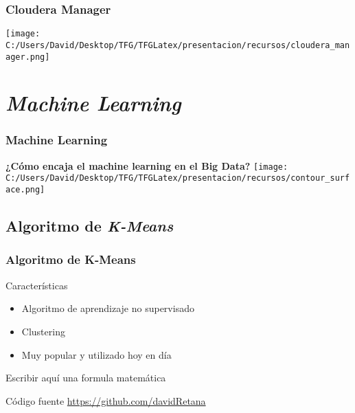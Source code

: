 \documentclass{beamer}
\begin{document}
\begin{frame}
  \frametitle{Cloudera Manager}
  \texttt{[image: C:/Users/David/Desktop/TFG/TFGLatex/presentacion/recursos/cloudera\_manager.png]}
\end{frame}

\section{\textit{Machine Learning}}

\begin{frame} %
\frametitle{Machine Learning}
\textbf{¿Cómo encaja el machine learning en el Big Data?}
\centering
\texttt{[image: C:/Users/David/Desktop/TFG/TFGLatex/presentacion/recursos/contour\_surface.png]}
\end{frame}


\subsection{Algoritmo de \textit{K-Means}}

\begin{frame}[fragile] %
\frametitle{Algoritmo de K-Means}

\begin{block}{Características}
  \begin{itemize}
    \item Algoritmo de aprendizaje no supervisado
    \item Clustering
    \item Muy popular y utilizado hoy en día
  \end{itemize}
\end{block}

\begin{block}{}
  Escribir aquí una formula matemática
\end{block}

\begin{block}{Código fuente}
\url{https://github.com/davidRetana}
\end{block}

\end{frame}
\end{document}
